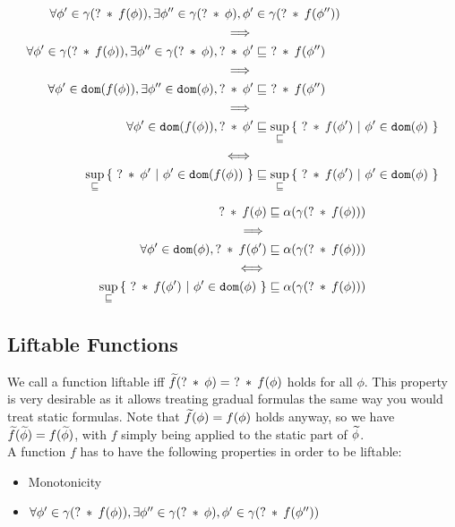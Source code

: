 \documentclass[11pt,a4paper]{article}
\begin{document}
\begin{align*}
\forall \phi' \in \gamma(?\:*\:f(\phi)), \exists \phi'' \in \gamma(?\:*\:\phi), \phi' &\in \gamma(?\:*\:f(\phi'')) \\
\implies \\
\forall \phi' \in \gamma(?\:*\:f(\phi)), \exists \phi'' \in \gamma(?\:*\:\phi), ?\:*\:\phi' &\sqsubseteq \,\,?\:*\:f(\phi'') \\
\implies \\
\forall \phi' \in \texttt{dom}(f(\phi)), \exists \phi'' \in \texttt{dom}(\phi), ?\:*\:\phi' &\sqsubseteq \,\,?\:*\:f(\phi'') \\
\implies \\
\forall \phi' \in \texttt{dom}(f(\phi)), ?\:*\:\phi' &\sqsubseteq \sup_{\sqsubseteq} {\{~ ?\:*\:f(\phi') ~|~ \phi' \in \texttt{dom}(\phi) ~\}} \\
\iff \\
\sup_{\sqsubseteq} {\{~ ?\:*\:\phi' ~|~ \phi' \in \texttt{dom}(f(\phi)) ~\}} &\sqsubseteq \sup_{\sqsubseteq} {\{~ ?\:*\:f(\phi') ~|~ \phi' \in \texttt{dom}(\phi) ~\}}
\end{align*}

\begin{align*}
?\:*\:f(\phi) &\sqsubseteq \alpha(\gamma(?\:*\:f(\phi))) \\
\implies \\
\forall \phi' \in \texttt{dom}(\phi), ?\:*\:f(\phi') &\sqsubseteq \alpha(\gamma(?\:*\:f(\phi))) \\
\iff \\
\sup_{\sqsubseteq} {\{~ ?\:*\:f(\phi') ~|~ \phi' \in \texttt{dom}(\phi) ~\}} &\sqsubseteq \alpha(\gamma(?\:*\:f(\phi)))
\end{align*}

\subsection{Liftable Functions}
We call a function liftable iff $\widetilde{f}(?\:*\:\phi) = \,\,?\:*\:f(\phi)$ holds for all $\phi$.
This property is very desirable as it allows treating gradual formulas the same way you would treat static formulas.
Note that $\widetilde{f}(\phi) = f(\phi)$ holds anyway, so we have $\widetilde{f}(\widetilde{\phi}) = f(\widetilde{\phi})$, with $f$ simply being applied to the static part of $\widetilde{\phi}$.\\

A function $f$ has to have the following properties in order to be liftable:
\begin{itemize}
    \item Monotonicity
    \item $\forall \phi' \in \gamma(?\:*\:f(\phi)), \exists \phi'' \in \gamma(?\:*\:\phi), \phi' \in \gamma(?\:*\:f(\phi''))$ 
\end{itemize}
\end{document}
